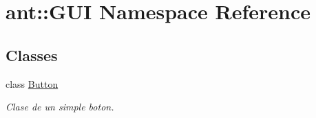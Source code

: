 \hypertarget{namespaceant_1_1_g_u_i}{\section{ant\+:\+:G\+U\+I Namespace Reference}
\label{namespaceant_1_1_g_u_i}
}
\subsection*{Classes}
\begin{DoxyCompactItemize}
\item 
class \hyperlink{classant_1_1_g_u_i_1_1_button}{Button}
\begin{DoxyCompactList}\small\item\em Clase de un simple boton. \end{DoxyCompactList}\end{DoxyCompactItemize}
